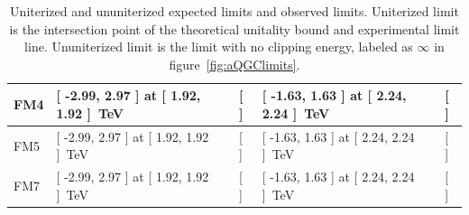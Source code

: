 \begin{table}[ht!]
\begin{center}
{\begin{tabular}{ | l || l | l | l | l | }
FM4                & [ -2.99, 2.97 ] at [ 1.92, 1.92 ]~TeV  & [  ]            & [ -1.63, 1.63 ] at [ 2.24, 2.24 ]~TeV & [  ]\tabularnewline \hline
FM5                & [ -2.99, 2.97 ] at [ 1.92, 1.92 ]~TeV  & [  ]            & [ -1.63, 1.63 ] at [ 2.24, 2.24 ]~TeV & [  ]\tabularnewline \hline
FM7                & [ -2.99, 2.97 ] at [ 1.92, 1.92 ]~TeV  & [  ]            & [ -1.63, 1.63 ] at [ 2.24, 2.24 ]~TeV & [  ]\tabularnewline \hline
\end{tabular}
}
\caption{Uniterized and ununiterized expected limits and observed limits. Uniterized limit is the intersection point of the theoretical unitality bound and experimental limit line. Ununiterized limit is the limit with no clipping energy, labeled as $\infty$ in figure~\ref{fig:aQGClimits}.}
\label{tab:aQGClimits}
\end{center}
\end{table}



